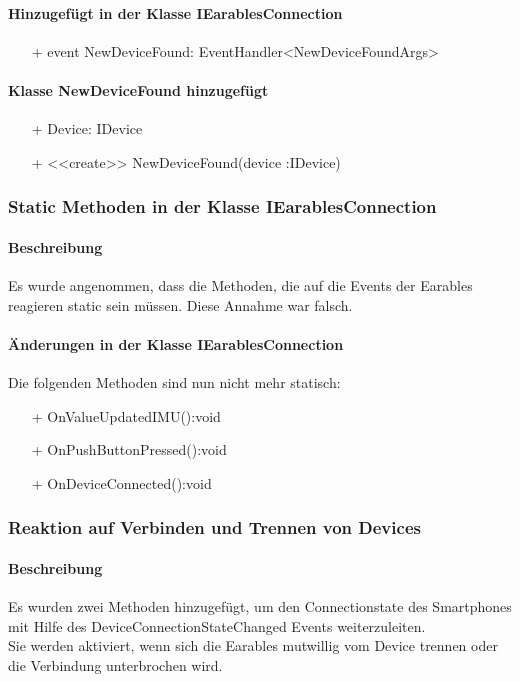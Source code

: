 \documentclass[a4paper,12pt]{article}
\begin{document}
\paragraph{Hinzugefügt in der Klasse IEarablesConnection}
\begin{itemize}
	\item[+] event NewDeviceFound: EventHandler<NewDeviceFoundArgs> 
\end{itemize}
\paragraph{Klasse NewDeviceFound hinzugefügt}
\begin{itemize}
	\item[+] Device: IDevice
	\item[+] <<create>> NewDeviceFound(device :IDevice)
\end{itemize}

\subsubsection{Static Methoden in der Klasse IEarablesConnection}
\paragraph{Beschreibung}
Es wurde angenommen, dass die Methoden, die auf die Events der Earables reagieren static sein müssen. Diese Annahme war falsch.
\paragraph{Änderungen in der Klasse IEarablesConnection}
Die folgenden Methoden sind nun nicht mehr statisch:
\begin{itemize}
  \item[+]OnValueUpdatedIMU():void
  \item[+]OnPushButtonPressed():void
  \item[+]OnDeviceConnected():void 
\end{itemize}


\subsubsection{Reaktion auf Verbinden und Trennen von Devices}
\paragraph{Beschreibung}
Es wurden zwei Methoden hinzugefügt, um den Connectionstate des Smartphones mit Hilfe des DeviceConnectionStateChanged Events weiterzuleiten.\\
 Sie werden aktiviert, wenn sich die Earables mutwillig vom Device trennen oder die Verbindung unterbrochen wird.
\end{document}
